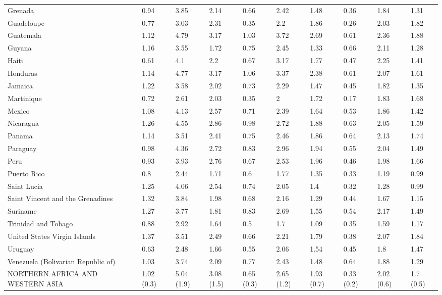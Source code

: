 \begin{longtable}[t]{llllllllll}
Grenada & 0.94 & 3.85 & 2.14 & 0.66 & 2.42 & 1.48 & 0.36 & 1.84 & 1.31\\
Guadeloupe & 0.77 & 3.03 & 2.31 & 0.35 & 2.2 & 1.86 & 0.26 & 2.03 & 1.82\\
Guatemala & 1.12 & 4.79 & 3.17 & 1.03 & 3.72 & 2.69 & 0.61 & 2.36 & 1.88\\
Guyana & 1.16 & 3.55 & 1.72 & 0.75 & 2.45 & 1.33 & 0.66 & 2.11 & 1.28\\
Haiti & 0.61 & 4.1 & 2.2 & 0.67 & 3.17 & 1.77 & 0.47 & 2.25 & 1.41\\
Honduras & 1.14 & 4.77 & 3.17 & 1.06 & 3.37 & 2.38 & 0.61 & 2.07 & 1.61\\
Jamaica & 1.22 & 3.58 & 2.02 & 0.73 & 2.29 & 1.47 & 0.45 & 1.82 & 1.35\\
Martinique & 0.72 & 2.61 & 2.03 & 0.35 & 2 & 1.72 & 0.17 & 1.83 & 1.68\\
Mexico & 1.08 & 4.13 & 2.57 & 0.71 & 2.39 & 1.64 & 0.53 & 1.86 & 1.42\\
Nicaragua & 1.26 & 4.55 & 2.86 & 0.98 & 2.72 & 1.88 & 0.63 & 2.05 & 1.59\\
Panama & 1.14 & 3.51 & 2.41 & 0.75 & 2.46 & 1.86 & 0.64 & 2.13 & 1.74\\
Paraguay & 0.98 & 4.36 & 2.72 & 0.83 & 2.96 & 1.94 & 0.55 & 2.04 & 1.49\\
Peru & 0.93 & 3.93 & 2.76 & 0.67 & 2.53 & 1.96 & 0.46 & 1.98 & 1.66\\
Puerto Rico & 0.8 & 2.44 & 1.71 & 0.6 & 1.77 & 1.35 & 0.33 & 1.19 & 0.99\\
Saint Lucia & 1.25 & 4.06 & 2.54 & 0.74 & 2.05 & 1.4 & 0.32 & 1.28 & 0.99\\
Saint Vincent and the Grenadines & 1.32 & 3.84 & 1.98 & 0.68 & 2.16 & 1.29 & 0.44 & 1.67 & 1.15\\
Suriname & 1.27 & 3.77 & 1.81 & 0.83 & 2.69 & 1.55 & 0.54 & 2.17 & 1.49\\
Trinidad and Tobago & 0.88 & 2.92 & 1.64 & 0.5 & 1.7 & 1.09 & 0.35 & 1.59 & 1.17\\
United States Virgin Islands & 1.37 & 3.51 & 2.49 & 0.66 & 2.21 & 1.79 & 0.38 & 2.07 & 1.84\\
Uruguay & 0.63 & 2.48 & 1.66 & 0.55 & 2.06 & 1.54 & 0.45 & 1.8 & 1.47\\
Venezuela (Bolivarian Republic of) & 1.03 & 3.74 & 2.09 & 0.77 & 2.43 & 1.48 & 0.64 & 1.88 & 1.29\\
NORTHERN AFRICA AND WESTERN ASIA & 1.02 (0.3) & 5.04 (1.9) & 3.08 (1.5) & 0.65 (0.3) & 2.65 (1.2) & 1.93 (0.7) & 0.33 (0.2) & 2.02 (0.6) & 1.7 (0.5)\\

\end{longtable}
